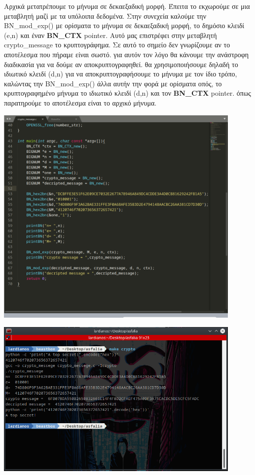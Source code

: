 Αρχικά μετατρέπουμε το μήνυμα σε δεκαεξαδική μορφή. Έπειτα το εκχωρούμε σε μια μεταβλητή μαζί με τα
υπόλοιπα δεδομένα. Στην συνεχεία καλούμε την BN\_mod\_exp() με ορίσματα το μήνυμα σε δεκαεξαδική μορφή, το
δημόσιο κλειδί (e,n) και έναν \textbf{BN\_CTX} pointer. Αυτό μας επιστρέφει στην μεταβλητή crypto\_message το 
κρυπτογράφημα. Σε αυτό το σημείο δεν γνωρίζουμε αν το αποτέλεσμα που πήραμε είναι σωστό. για αυτόν τον λόγο
θα κάνουμε την ανάστροφη διαδικασία για να δούμε αν αποκρυπτογραφηθεί. θα χρησιμοποιήσουμε δηλαδή το ιδιωτικό
κλειδί (d,n) για να αποκρυπτογραφήσουμε το μήνυμα με τον ίδιο τρόπο, καλώντας την BN\_mod\_exp() άλλα αυτήν την φορά με ορίσματα οπός, το κρυπτογραφημένο μήνυμα το ιδιωτικό κλειδί (d,n) και τον \textbf{BN\_CTX} pointer. όπως παρατηρούμε το αποτέλεσμα είναι το αρχικό μήνυμα.
\begin{center}
			\includegraphics[width=0.9\textwidth]{image/image32code.PNG}		
\end{center}
\begin{center}
			\includegraphics[width=0.9\textwidth]{image/image32term.PNG}		
\end{center}
